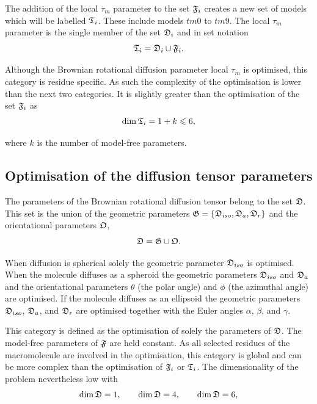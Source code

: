 The addition of the local $\tau_m$ parameter to the set $\mathfrak{F}_i$ creates a new set of models which will be labelled $\mathfrak{T}_i$.  These include models $tm0$ to $tm9$.  The local $\tau_m$ parameter is the single member of the set $\mathfrak{D}_i$ and in set notation
\begin{equation}
    \mathfrak{T}_i = \mathfrak{D}_i \cup \mathfrak{F}_i.
\end{equation}

Although the Brownian rotational diffusion parameter local $\tau_m$ is optimised, this category is residue specific.  As such the complexity of the optimisation is lower than the next two categories.  It is slightly greater than the optimisation of the set $\mathfrak{F}_i$ as
\begin{equation}
    \dim \mathfrak{T}_i = 1 + k \leqslant 6,
\end{equation}

\noindent where $k$ is the number of model-free parameters.




\subsection{Optimisation of the diffusion tensor parameters}

The parameters of the Brownian rotational diffusion tensor belong to the set $\mathfrak{D}$.  This set is the union of the geometric parameters $\mathfrak{G} = \{\mathfrak{D}_{iso}, \mathfrak{D}_a, \mathfrak{D}_r\}$ and the orientational parameters $\mathfrak{O}$,
\begin{equation}
    \mathfrak{D} = \mathfrak{G} \cup \mathfrak{O}.
\end{equation}

\noindent When diffusion is spherical solely the geometric parameter $\mathfrak{D}_{iso}$ is optimised.  When the molecule diffuses as a spheroid the geometric parameters $\mathfrak{D}_{iso}$ and $\mathfrak{D}_a$ and the orientational parameters $\theta$ (the polar angle) and $\phi$ (the azimuthal angle) are optimised.  If the molecule diffuses as an ellipsoid the geometric parameters $\mathfrak{D}_{iso}$, $\mathfrak{D}_a$, and $\mathfrak{D}_r$ are optimised together with the Euler angles $\alpha$, $\beta$, and $\gamma$.

This category is defined as the optimisation of solely the parameters of $\mathfrak{D}$.  The model-free parameters of $\mathfrak{F}$ are held constant.  As all selected residues of the macromolecule are involved in the optimisation, this category is global and can be more complex than the optimisation of $\mathfrak{F}_i$ or $\mathfrak{T}_i$.  The dimensionality of the problem nevertheless low with
\begin{equation}
    \dim \mathfrak{D} = 1, \qquad \dim \mathfrak{D} = 4, \qquad \dim \mathfrak{D} = 6,
\end{equation}

